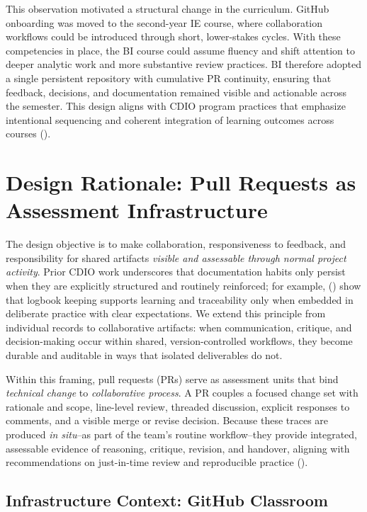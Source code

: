This observation motivated a structural change in the curriculum. GitHub onboarding was moved to the second-year IE course, where collaboration workflows could be introduced through short, lower-stakes cycles. With these competencies in place, the BI course could assume fluency and shift attention to deeper analytic work and more substantive review practices. BI therefore adopted a single persistent repository with cumulative PR continuity, ensuring that feedback, decisions, and documentation remained visible and actionable across the semester. This design aligns with CDIO program practices that emphasize intentional sequencing and coherent integration of learning outcomes across courses (\cite{malmqvist2006integrated}).


\section{Design Rationale: Pull Requests as Assessment Infrastructure}
The design objective is to make collaboration, responsiveness to feedback, and responsibility for shared artifacts \emph{visible and assessable through normal project activity}. Prior CDIO work underscores that documentation habits only persist when they are explicitly structured and routinely reinforced; for example, \citeauthor{junaid2018logbook} (\citeyear{junaid2018logbook}) show that logbook keeping supports learning and traceability only when embedded in deliberate practice with clear expectations. We extend this principle from individual records to collaborative artifacts: when communication, critique, and decision-making occur within shared, version-controlled workflows, they become durable and auditable in ways that isolated deliverables do not.

Within this framing, pull requests (PRs) serve as assessment units that bind \emph{technical change} to \emph{collaborative process}. A PR couples a focused change set with rationale and scope, line-level review, threaded discussion, explicit responses to comments, and a visible merge or revise decision. Because these traces are produced \emph{in situ}--as part of the team’s routine workflow--they provide integrated, assessable evidence of reasoning, critique, revision, and handover, aligning with recommendations on just-in-time review and reproducible practice (\cite{PetreWilson2014WSSSPE,Wilson2017GoodEnough}).

\subsection{Infrastructure Context: GitHub Classroom}

